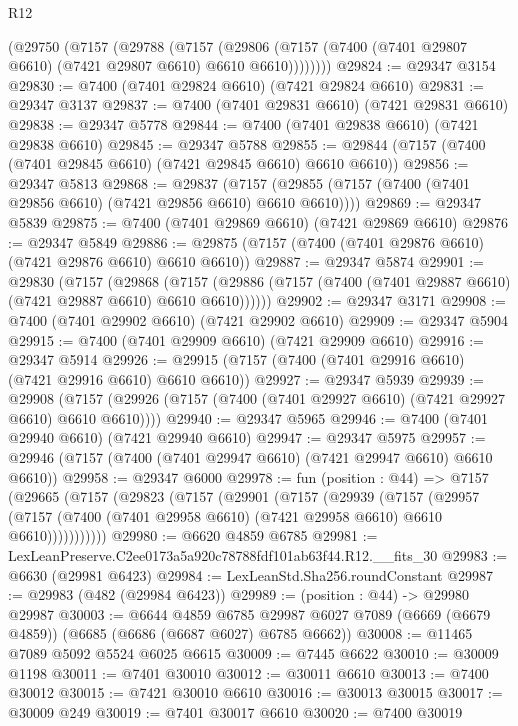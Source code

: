 \begin{lexlean}{R12}
\begin{coremodule}
      (@29750
        (@7157
          (@29788
            (@7157
              (@29806 (@7157 (@7400 (@7401 @29807 @6610) (@7421 @29807 @6610) @6610 @6610))))))))
@29824 := @29347 @3154
@29830 := @7400 (@7401 @29824 @6610) (@7421 @29824 @6610)
@29831 := @29347 @3137
@29837 := @7400 (@7401 @29831 @6610) (@7421 @29831 @6610)
@29838 := @29347 @5778
@29844 := @7400 (@7401 @29838 @6610) (@7421 @29838 @6610)
@29845 := @29347 @5788
@29855 := @29844 (@7157 (@7400 (@7401 @29845 @6610) (@7421 @29845 @6610) @6610 @6610))
@29856 := @29347 @5813
@29868 := @29837
    (@7157 (@29855 (@7157 (@7400 (@7401 @29856 @6610) (@7421 @29856 @6610) @6610 @6610))))
@29869 := @29347 @5839
@29875 := @7400 (@7401 @29869 @6610) (@7421 @29869 @6610)
@29876 := @29347 @5849
@29886 := @29875 (@7157 (@7400 (@7401 @29876 @6610) (@7421 @29876 @6610) @6610 @6610))
@29887 := @29347 @5874
@29901 := @29830
    (@7157
      (@29868
        (@7157 (@29886 (@7157 (@7400 (@7401 @29887 @6610) (@7421 @29887 @6610) @6610 @6610))))))
@29902 := @29347 @3171
@29908 := @7400 (@7401 @29902 @6610) (@7421 @29902 @6610)
@29909 := @29347 @5904
@29915 := @7400 (@7401 @29909 @6610) (@7421 @29909 @6610)
@29916 := @29347 @5914
@29926 := @29915 (@7157 (@7400 (@7401 @29916 @6610) (@7421 @29916 @6610) @6610 @6610))
@29927 := @29347 @5939
@29939 := @29908
    (@7157 (@29926 (@7157 (@7400 (@7401 @29927 @6610) (@7421 @29927 @6610) @6610 @6610))))
@29940 := @29347 @5965
@29946 := @7400 (@7401 @29940 @6610) (@7421 @29940 @6610)
@29947 := @29347 @5975
@29957 := @29946 (@7157 (@7400 (@7401 @29947 @6610) (@7421 @29947 @6610) @6610 @6610))
@29958 := @29347 @6000
@29978 := fun (position : @44) =>
  @7157
    (@29665
      (@7157
        (@29823
          (@7157
            (@29901
              (@7157
                (@29939
                  (@7157
                    (@29957
                      (@7157 (@7400 (@7401 @29958 @6610) (@7421 @29958 @6610) @6610 @6610)))))))))))
@29980 := @6620 @4859 @6785
@29981 := LexLeanPreserve.C2ee0173a5a920c78788fdf101ab63f44.R12.__fits_30
@29983 := @6630 (@29981 @6423)
@29984 := LexLeanStd.Sha256.roundConstant
@29987 := @29983 (@482 (@29984 @6423))
@29989 := (position : @44) -> @29980 @29987
@30003 := @6644
    @4859
    @6785
    @29987
    @6027
    @7089
    (@6669 (@6679 @4859))
    (@6685 (@6686 (@6687 @6027) @6785 @6662))
@30008 := @11465 @7089 @5092 @5524 @6025 @6615
@30009 := @7445 @6622
@30010 := @30009 @1198
@30011 := @7401 @30010
@30012 := @30011 @6610
@30013 := @7400 @30012
@30015 := @7421 @30010 @6610
@30016 := @30013 @30015
@30017 := @30009 @249
@30019 := @7401 @30017 @6610
@30020 := @7400 @30019

\end{coremodule}
\end{lexlean}
